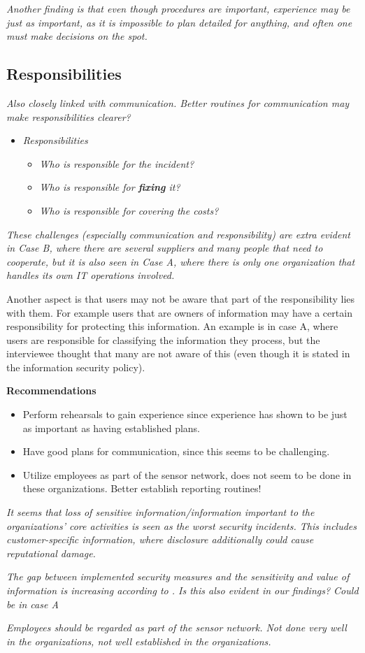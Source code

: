 \textit{Another finding is that even though procedures are important, experience may be just as important, as it is impossible to plan detailed for anything, and often one must make decisions on the spot.}

\subsection{Responsibilities}
\textit{Also closely linked with communication. Better routines for communication may make responsibilities clearer?}

\begin{itemize}
\item \textit{Responsibilities}
\begin{itemize}
\item \textit{Who is responsible for the incident?}
\item \textit{Who is responsible for \textbf{fixing} it?}
\item \textit{Who is responsible for covering the costs?}
\end{itemize}
\end{itemize}

\textit{These challenges (especially communication and responsibility) are extra evident in Case B, where there are several suppliers and many people that need to cooperate, but it is also seen in Case A, where there is only one organization that handles its own IT operations involved.}

Another aspect is that users may not be aware that part of the responsibility lies with them. For example users that are owners of information may have a certain responsibility for protecting this information. An example is in case A, where users are responsible for classifying the information they process, but the interviewee thought that many are not aware of this (even though it is stated in the information security policy).

\textbf{Recommendations}
\begin{itemize}
\item Perform rehearsals to gain experience since experience has shown to be just as important as having established plans.
\item Have good plans for communication, since this seems to be challenging.
\item Utilize employees as part of the sensor network, does not seem to be done in these organizations. Better establish reporting routines!
\end{itemize}

\textit{It seems that loss of sensitive information/information important to the organizations' core activities is seen as the worst security incidents. This includes customer-specific information, where disclosure additionally could cause reputational damage.}

\textit{The gap between implemented security measures and the sensitivity and value of information is increasing according to \cite{Morketall2012}. Is this also evident in our findings? Could be in case A}

\textit{Employees should be regarded as part of the sensor network. Not done very well in the organizations, not well established in the organizations.}